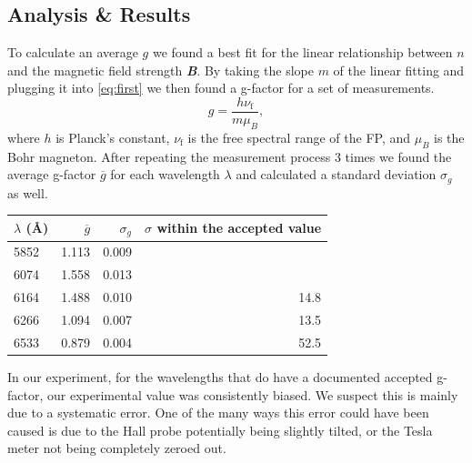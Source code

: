 \documentclass[a4paper,12pt,english]{all-in-one} %
\begin{document}
\begin{multicols}{2}
\section*{Analysis \& Results}
{
To calculate an average $g$ we found a best fit for the linear relationship between $n$ and the magnetic field strength \textbf{\textit{B}}. By taking the slope $m$ of the linear fitting and plugging it into \eqref{eq:first} we then found a g-factor for a set of measurements.
\begin{equation}\label{eq:first}
    g=\dfrac{h \nu_{\mathrm{f}}}{m \mu_{B}},
\end{equation}
where $h$ is Planck's constant, $\nu_{\mathrm{f}}$ is the free spectral range of the FP, and $\mu_{B}$ is the Bohr magneton. 
After repeating the measurement process 3 times we found the average g-factor $\overline{g}$ for each wavelength $\lambda$ and calculated a standard deviation $\sigma_{g}$ as well.


\begin{center}
\begin{tabular}{l|r|r|r}
$\lambda$ (\AA) & $\overline{g}$ & $\sigma_{g}$ & $\sigma$ within the accepted value \\ \hline
5852 & 1.113 & 0.009  \\
6074 & 1.558 & 0.013 \\
6164 & 1.488 & 0.010 & 14.8 \\
6266 & 1.094 & 0.007 & 13.5 \\
6533 & 0.879 & 0.004 & 52.5
\end{tabular}
\end{center}

In our experiment, for the wavelengths that do have a documented accepted g-factor, our experimental value was consistently biased. We suspect this is mainly due to a systematic error. One of the many ways this error could have been caused is due to the Hall probe potentially being slightly tilted, or the Tesla meter not being completely zeroed out. 
}
\end{multicols}
\end{document}
